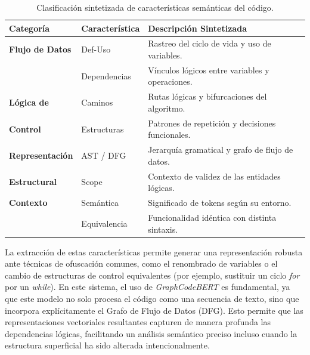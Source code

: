 \begin{table}[H]
	\centering
	\small
	\begin{tabularx}{\textwidth}{l l X}
		\toprule
		\textbf{Categoría}      & \textbf{Característica} & \textbf{Descripción Sintetizada}                 \\
		\midrule
		\textbf{Flujo de Datos} & Def-Uso                 & Rastreo del ciclo de vida y uso de variables.    \\
		                        & Dependencias            & Vínculos lógicos entre variables y operaciones.  \\
		\midrule
		\textbf{Lógica de}      & Caminos                 & Rutas lógicas y bifurcaciones del algoritmo.     \\
		\textbf{Control}        & Estructuras             & Patrones de repetición y decisiones funcionales. \\
		\midrule
		\textbf{Representación} & AST / DFG               & Jerarquía gramatical y grafo de flujo de datos.  \\
		\textbf{Estructural}    & Scope                   & Contexto de validez de las entidades lógicas.    \\
		\midrule
		\textbf{Contexto}       & Semántica               & Significado de tokens según su entorno.          \\
		                        & Equivalencia            & Funcionalidad idéntica con distinta sintaxis.    \\
		\bottomrule
	\end{tabularx}
	\caption{Clasificación sintetizada de características semánticas del código.}
	\label{tab:caracteristicas_semanticas}
\end{table}

La extracción de estas características permite generar una representación robusta ante técnicas de ofuscación comunes, como el renombrado de variables o el cambio de estructuras de control equivalentes (por ejemplo, sustituir un ciclo \textit{for} por un \textit{while}). En este sistema, el uso de \textit{GraphCodeBERT} es fundamental, ya que este modelo no solo procesa el código como una secuencia de texto, sino que incorpora explícitamente el Grafo de Flujo de Datos (DFG). Esto permite que las representaciones vectoriales resultantes capturen de manera profunda las dependencias lógicas, facilitando un análisis semántico preciso incluso cuando la estructura superficial ha sido alterada intencionalmente.

